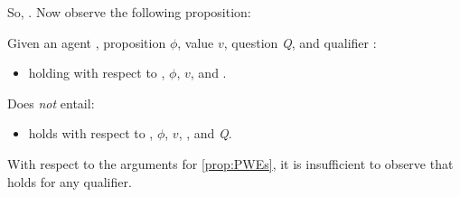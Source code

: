 \begin{note}[Proposition]
  So, \ptivityQ{}.
  Now observe the following proposition:

  \begin{proposition}
    \label{prop:ptivity-ne-ptivityQ}
    Given an agent \vAgent{}, proposition \(\phi\), value \(v\), question \emph{Q}, and qualifier \ptivityQV{}:

    \begin{itemize}
    \item
       holding with respect to \vAgent{}, \(\phi\), \(v\), and \ptivityQV{}.
    \end{itemize}

    Does \emph{not} entail:

    \begin{itemize}
    \item
       holds with respect to \vAgent{}, \(\phi\), \(v\), \ptivityQV{}, and \emph{Q}.
    \end{itemize}
    \vspace{-\baselineskip}
  \end{proposition}

  With respect to the arguments for \autoref{prop:PWEs}, it is insufficient to observe that \ptivity{} holds for any qualifier.
\end{note}


